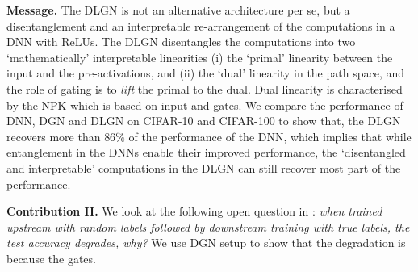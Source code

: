 \textbf{Message.} The DLGN is not an alternative architecture per se, but a disentanglement and an interpretable re-arrangement of the computations in a DNN with ReLUs. The DLGN disentangles the computations into two  `mathematically' interpretable linearities (i) the `primal' linearity between the input and the pre-activations, and (ii) the `dual' linearity in the path space, and the role of gating is to \emph{lift} the primal to the dual. Dual linearity is characterised by the NPK which is based on input and gates. We compare the performance of DNN, DGN and DLGN on CIFAR-10 and CIFAR-100 to show that, the DLGN recovers more than $86\%$ of the performance of the DNN, which implies that while entanglement in the DNNs enable their improved performance,  the `disentangled and interpretable'  computations in the DLGN can still recover most part of the performance.

\textbf{Contribution II.} We look at the following open question in \citep{randlabel}: \emph{when trained upstream with random labels followed by downstream training with true labels, the test accuracy degrades, why?} We use DGN setup to show that the degradation is because the gates.%







